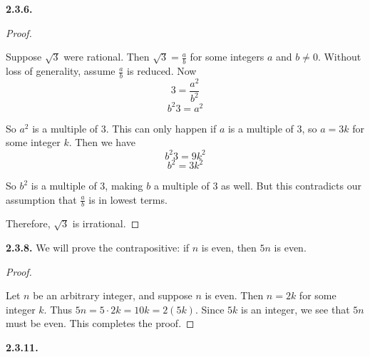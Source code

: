 \documentclass[12pt,]{book}
\theoremstyle{plain}
\theoremstyle{definition}
\theoremstyle{definition}
\theoremstyle{definition}
\numberwithin{equation}{chapter}
\begin{document}
\noindent\textbf{2.3.6.} \begin{proof}\hypertarget{proof-34}{}
\hypertarget{p-1445}{}%
Suppose \(\sqrt{3}\) were rational. Then \(\sqrt{3} = \frac{a}{b}\) for some integers \(a\) and \(b \ne 0\). Without loss of generality, assume \(\frac{a}{b}\) is reduced. Now%
\begin{equation*}
3 = \frac{a^2}{b^2}
\end{equation*}
%
\begin{equation*}
b^2 3 = a^2
\end{equation*}
%
\par
\hypertarget{p-1446}{}%
So \(a^2\) is a multiple of 3. This can only happen if \(a\) is a multiple of 3, so \(a = 3k\) for some integer \(k\). Then we have%
\begin{equation*}
b^2 3 = 9k^2
\end{equation*}
%
\begin{equation*}
b^2 = 3k^2
\end{equation*}
%
\par
\hypertarget{p-1447}{}%
So \(b^2\) is a multiple of 3, making \(b\) a multiple of 3 as well. But this contradicts our assumption that \(\frac{a}{b}\) is in lowest terms.%
\par
\hypertarget{p-1448}{}%
Therefore, \(\sqrt{3}\) is irrational.%
\end{proof}
\par\smallskip
\noindent\textbf{2.3.8.} \hypertarget{p-1454}{}%
We will prove the contrapositive: if \(n\) is even, then \(5n\) is even.%
\begin{proof}\hypertarget{proof-35}{}
\hypertarget{p-1455}{}%
Let \(n\) be an arbitrary integer, and suppose \(n\) is even. Then \(n = 2k\) for some integer \(k\). Thus \(5n = 5\cdot 2k = 10k = 2(5k)\). Since \(5k\) is an integer, we see that \(5n\) must be even. This completes the proof.%
\end{proof}
\par\smallskip
\noindent\textbf{2.3.11.} \hypertarget{p-1460}{}%
\leavevmode%
\end{document}
